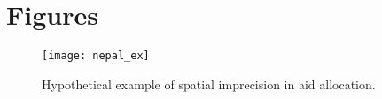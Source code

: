 \section{Figures}

\begin{figure}
\texttt{[image: nepal\_ex]}
\caption{Hypothetical example of spatial imprecision in aid allocation.}\label{fig:nepalex}
\end{figure}
